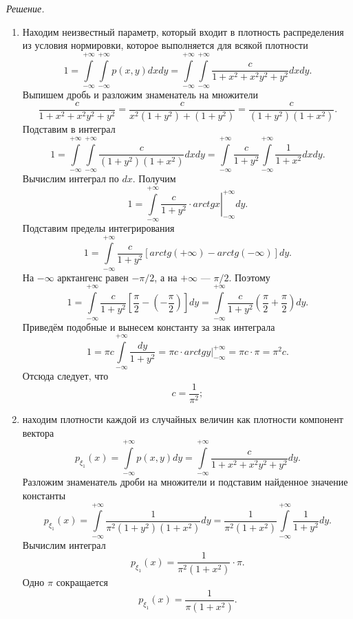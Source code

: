 \textit{Решение.}
\begin{enumerate}[label=\alph*)]
\item Находим неизвестный параметр, который входит в плотность распределения из условия нормировки, которое выполняется для всякой плотности
$$1 =
\int \limits_{- \infty }^{+ \infty } \int \limits_{- \infty }^{+ \infty } p \left( x, y \right) dxdy =
\int \limits_{- \infty }^{+ \infty } \int \limits_{- \infty }^{+ \infty } \frac{c}{1 + x^2 + x^2 y^2 + y^2} dxdy.$$
Выпишем дробь и разложим знаменатель на множители
$$ \frac{c}{1 + x^2 + x^2 y^2 + y^2} =
\frac{c}{x^2 \left( 1 + y^2 \right) + \left( 1 + y^2 \right) } =
\frac{c}{ \left( 1 + y^2 \right) \left( 1 + x^2 \right) }.$$
Подставим в интеграл
$$1 =
\int \limits_{- \infty }^{+ \infty } \int \limits_{- \infty }^{+ \infty } \frac{c}{ \left( 1 + y^2 \right) \left( 1 + x^2 \right) } dxdy =
\int \limits_{- \infty }^{+ \infty } \frac{c}{1 + y^2} \int \limits_{- \infty }^{+ \infty } \frac{1}{1 + x^2} dxdy.$$
Вычислим интеграл по $dx$.
Получим
$$1 =
\int \limits_{- \infty }^{+ \infty } \left. \frac{c}{1 + y^2} \cdot arctg x \right|_{- \infty }^{+ \infty } dy.$$
Подставим пределы интегрирования
$$1 =
\int \limits_{- \infty }^{+ \infty } \frac{c}{1 + y^2} \left[ arctg \left( + \infty \right) - arctg \left( - \infty \right) \right] dy.$$
На $- \infty $ арктангенс равен $ - \pi/2$, а на $+ \infty $ --- $ \pi/2$.
Поэтому
$$1 =
\int \limits_{- \infty }^{+ \infty } \frac{c}{1 + y^2} \left[ \frac{ \pi }{2} - \left( - \frac{ \pi }{2} \right) \right] dy =
\int \limits_{- \infty }^{+ \infty } \frac{c}{1 + y^2} \left( \frac{ \pi }{2} + \frac{ \pi }{2} \right) dy.$$
Приведём подобные и вынесем константу за знак интеграла
$$1 =
\pi c \int \limits_{- \infty }^{+ \infty } \frac{dy}{1 + y^2} =
\left. \pi c \cdot arctg y \right|_{- \infty }^{+ \infty } =
\pi c \cdot \pi =
\pi^2 c.$$
Отсюда следует, что
$$c =
\frac{1}{ \pi^2};$$
\item находим плотности каждой из случайных величин как плотности компонент вектора
$$p_{ \xi_1} \left( x \right) =
\int \limits_{- \infty }^{+ \infty } p \left( x, y \right) dy =
\int \limits_{- \infty }^{+ \infty } \frac{c}{1 + x^2 + x^2 y^2 + y^2} dy.$$
Разложим знаменатель дроби на множители и подставим найденное значение константы
$$p_{ \xi_1} \left( x \right) =
\int \limits_{- \infty }^{+ \infty } \frac{1}{ \pi^2 \left( 1 + y^2 \right) \left( 1 + x^2 \right) } dy =
\frac{1}{ \pi^2 \left( 1 + x^2 \right) } \int \limits_{- \infty }^{+ \infty } \frac{1}{1 + y^2} dy.$$
Вычислим интеграл
$$p_{ \xi_1} \left( x \right) =
\frac{1}{ \pi^2 \left( 1 + x^2 \right) } \cdot \pi.$$
Одно $ \pi $ сокращается
$$p_{ \xi_1} \left( x \right) =
\frac{1}{ \pi \left( 1 + x^2 \right) }.$$


\end{enumerate}
